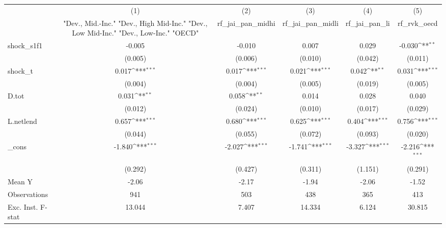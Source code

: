 {
\def\sym#1{\ifmmode^{#1}\else\(^{#1}\)\fi}
\begin{tabular}{l*{5}{c}}
\toprule
            &\multicolumn{1}{c}{(1)}&\multicolumn{1}{c}{(2)}&\multicolumn{1}{c}{(3)}&\multicolumn{1}{c}{(4)}&\multicolumn{1}{c}{(5)}\\
            &\multicolumn{1}{c}{ "Dev., Mid.-Inc." "Dev., High Mid-Inc." "Dev., Low Mid-Inc." "Dev., Low-Inc." "OECD" }&\multicolumn{1}{c}{rf\_jai\_pan\_midhi}&\multicolumn{1}{c}{rf\_jai\_pan\_midli}&\multicolumn{1}{c}{rf\_jai\_pan\_li}&\multicolumn{1}{c}{rf\_rvk\_oecd}\\
\midrule
shock\_s1f1  &      -0.005         &      -0.010         &       0.007         &       0.029         &      -0.030\sym{**} \\
            &     (0.005)         &     (0.006)         &     (0.010)         &     (0.042)         &     (0.011)         \\
\addlinespace
shock\_t     &       0.017\sym{***}&       0.017\sym{***}&       0.021\sym{***}&       0.042\sym{**} &       0.031\sym{***}\\
            &     (0.004)         &     (0.004)         &     (0.005)         &     (0.019)         &     (0.005)         \\
\addlinespace
D.tot       &       0.031\sym{**} &       0.058\sym{**} &       0.014         &       0.028         &       0.040         \\
            &     (0.012)         &     (0.024)         &     (0.010)         &     (0.017)         &     (0.029)         \\
\addlinespace
L.netlend   &       0.657\sym{***}&       0.680\sym{***}&       0.625\sym{***}&       0.404\sym{***}&       0.756\sym{***}\\
            &     (0.044)         &     (0.055)         &     (0.072)         &     (0.093)         &     (0.020)         \\
\addlinespace
\_cons      &      -1.840\sym{***}&      -2.027\sym{***}&      -1.741\sym{***}&      -3.327\sym{***}&      -2.216\sym{***}\\
            &     (0.292)         &     (0.427)         &     (0.311)         &     (1.151)         &     (0.291)         \\
\midrule
Mean Y      &       -2.06         &       -2.17         &       -1.94         &       -2.06         &       -1.52         \\
Observations&         941         &         503         &         438         &         365         &         413         \\
Exc. Inst. F-stat&      13.044         &       7.407         &      14.334         &       6.124         &      30.815         \\
\bottomrule
\end{tabular}
}
